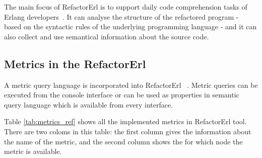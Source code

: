The main focus of RefactorErl is to support daily code comprehension tasks of Erlang developers~\cite{refactorerl}. It can analyse the structure of the refactored program - based on the syntactic rules of the underlying programming language - and it can also collect and use semantical information about the source code.

\subsection{Metrics in the RefactorErl}

A metric query language is incorporated into RefactorErl~\cite{refactorerl} . Metric queries can be executed from the console interface or can be used as properties in semantic query language which is available from every interface.

Table \ref{tab:metrics_ref} shows all the implemented metrics in RefactorErl tool. There are two coloms in this table: the first column gives the information about the name of the metric, and the second column shows the for which node the metric is available.

